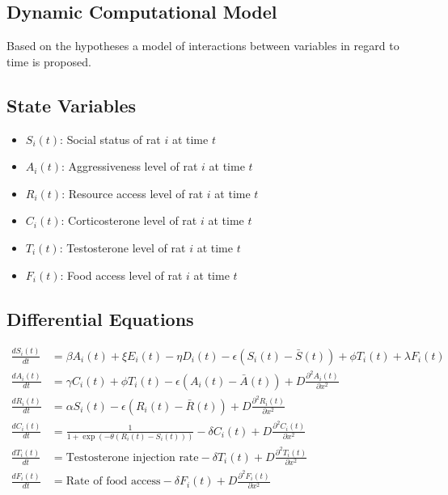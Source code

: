 \documentclass[english, a4paper, 11pt]{article}
\begin{document}
\subsection*{Dynamic Computational Model}
Based on the hypotheses a model of interactions between variables in regard to time is proposed.  
\subsection*{State Variables}
\begin{itemize}
    \item \( S_i(t) \): Social status of rat \( i \) at time \( t \)
    \item \( A_i(t) \): Aggressiveness level of rat \( i \) at time \( t \)
    \item \( R_i(t) \): Resource access level of rat \( i \) at time \( t \)
    \item \( C_i(t) \): Corticosterone level of rat \( i \) at time \( t \)
    \item \( T_i(t) \): Testosterone level of rat \( i \) at time \( t \)
    \item \( F_i(t) \): Food access level of rat \( i \) at time \( t \)
\end{itemize}

\subsection*{Differential Equations}
\begin{align*}
    \frac{dS_i(t)}{dt} & = \beta A_i(t) + \xi E_i(t) - \eta D_i(t) - \epsilon (S_i(t) - \bar{S}(t)) + \phi T_i(t) + \lambda F_i(t)  \\
    \frac{dA_i(t)}{dt} & = \gamma C_i(t) + \phi T_i(t) - \epsilon (A_i(t) - \bar{A}(t)) + D \frac{\partial^2 A_i(t)}{\partial x^2}  \\
    \frac{dR_i(t)}{dt} & = \alpha S_i(t) - \epsilon (R_i(t) - \bar{R}(t)) + D \frac{\partial^2 R_i(t)}{\partial x^2}                \\
    \frac{dC_i(t)}{dt} & = \frac{1}{1 + \exp(-\theta (R_i(t) - S_i(t)))} - \delta C_i(t) + D \frac{\partial^2 C_i(t)}{\partial x^2} \\
    \frac{dT_i(t)}{dt} & = \text{Testosterone injection rate} - \delta T_i(t) + D \frac{\partial^2 T_i(t)}{\partial x^2}            \\
    \frac{dF_i(t)}{dt} & = \text{Rate of food access} - \delta F_i(t) + D \frac{\partial^2 F_i(t)}{\partial x^2}
\end{align*}
\end{document}
